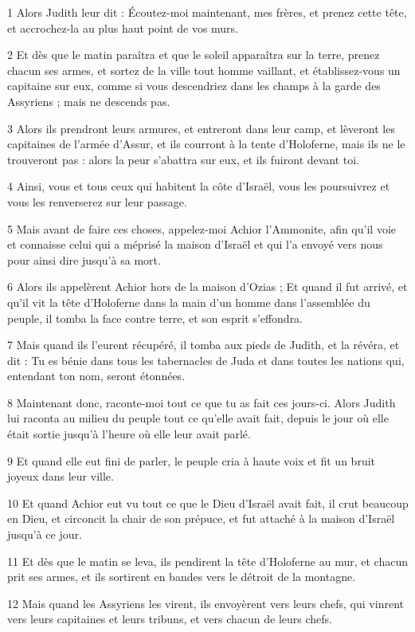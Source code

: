 \par 1 Alors Judith leur dit : Écoutez-moi maintenant, mes frères, et prenez cette tête, et accrochez-la au plus haut point de vos murs.
\par 2 Et dès que le matin paraîtra et que le soleil apparaîtra sur la terre, prenez chacun ses armes, et sortez de la ville tout homme vaillant, et établissez-vous un capitaine sur eux, comme si vous descendriez dans les champs à la garde des Assyriens ; mais ne descends pas.
\par 3 Alors ils prendront leurs armures, et entreront dans leur camp, et lèveront les capitaines de l'armée d'Assur, et ils courront à la tente d'Holoferne, mais ils ne le trouveront pas : alors la peur s'abattra sur eux, et ils fuiront devant toi.
\par 4 Ainsi, vous et tous ceux qui habitent la côte d'Israël, vous les poursuivrez et vous les renverserez sur leur passage.
\par 5 Mais avant de faire ces choses, appelez-moi Achior l'Ammonite, afin qu'il voie et connaisse celui qui a méprisé la maison d'Israël et qui l'a envoyé vers nous pour ainsi dire jusqu'à sa mort.
\par 6 Alors ils appelèrent Achior hors de la maison d'Ozias ; Et quand il fut arrivé, et qu'il vit la tête d'Holoferne dans la main d'un homme dans l'assemblée du peuple, il tomba la face contre terre, et son esprit s'effondra.
\par 7 Mais quand ils l'eurent récupéré, il tomba aux pieds de Judith, et la révéra, et dit : Tu es bénie dans tous les tabernacles de Juda et dans toutes les nations qui, entendant ton nom, seront étonnées.
\par 8 Maintenant donc, raconte-moi tout ce que tu as fait ces jours-ci. Alors Judith lui raconta au milieu du peuple tout ce qu'elle avait fait, depuis le jour où elle était sortie jusqu'à l'heure où elle leur avait parlé.
\par 9 Et quand elle eut fini de parler, le peuple cria à haute voix et fit un bruit joyeux dans leur ville.
\par 10 Et quand Achior eut vu tout ce que le Dieu d'Israël avait fait, il crut beaucoup en Dieu, et circoncit la chair de son prépuce, et fut attaché à la maison d'Israël jusqu'à ce jour.
\par 11 Et dès que le matin se leva, ils pendirent la tête d'Holoferne au mur, et chacun prit ses armes, et ils sortirent en bandes vers le détroit de la montagne.
\par 12 Mais quand les Assyriens les virent, ils envoyèrent vers leurs chefs, qui vinrent vers leurs capitaines et leurs tribuns, et vers chacun de leurs chefs.

